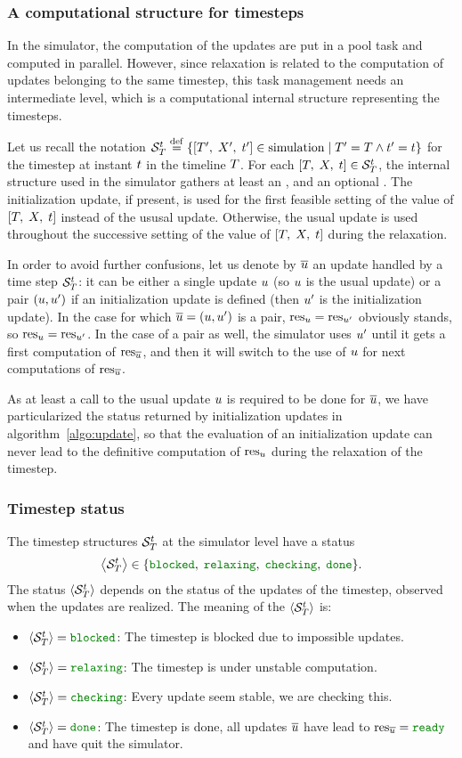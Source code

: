 \subsubsection{A computational structure for timesteps}

In the simulator, the computation of the updates are put in a pool task and computed in parallel. However, since relaxation is related to the computation of updates belonging to the same timestep, this task management needs an intermediate level, which is a computational internal structure representing the timesteps.

Let us recall the notation ${{{\cal S}}_{T}^{t}}\;{\stackrel{\mathrm{def}}{=}}\;{\left\{{\left[ T',\;X',\;t' \right]} \in {\mbox{simulation}}\; \middle| \; {{T'} = {T}} \wedge {{t'} = {t}}\right\}}$ for the timestep at instant $t$ in the timeline $T$. For each ${\left[ T,\;X,\;t \right]} \in {{{\cal S}}_{T}^{t}}$, the internal structure used in the simulator gathers at least an , and an optional . The initialization update, if present, is used for the first feasible setting of the value of $\left[ T,\;X,\;t \right]$ instead of the ususal update. Otherwise, the usual update is used throughout the successive setting of the value of $\left[ T,\;X,\;t \right]$ during the relaxation.


In order to avoid further confusions, let us denote by $\overline{u}$ an update handled by a time step ${{\cal S}}_{T}^{t}$: it can be either a single update $u$ (so $u$ is the usual update) or a pair $\left(u,u'\right)$ if an initialization update is defined (then $u'$ is the initialization update). In the case for which ${\overline{u}} = {\left(u,u'\right)}$ is a pair, ${{\mathrm{res}}_{u}} = {{\mathrm{res}}_{u'}}$ obviously stands, so ${{\mathrm{res}}_{u}} = {{\mathrm{res}}_{u'}}$. In the case of a pair as well, the simulator uses $u'$ until it gets a first computation of ${\mathrm{res}}_{\overline{u}}$, and then it will switch to the use of $u$ for next computations of ${\mathrm{res}}_{\overline{u}}$.

As at least a call to the usual update $u$ is required to be done for $\overline{u}$, we have particularized the status returned by initialization updates in algorithm~\ref{algo:update}, so that the evaluation of an initialization update can never lead to the definitive computation of ${\mathrm{res}}_{u}$ during the relaxation of the timestep.

\subsubsection{Timestep status}

The timestep structures ${{\cal S}}_{T}^{t}$ at the simulator level have a status $$\cxStatusSet.$$ The status $\left< {{\cal S}}_{T}^{t} \right>$ depends on the status of the updates of the timestep, observed when the updates are realized. The meaning of the $\left< {{\cal S}}_{T}^{t} \right>$ is:
\begin{itemize}
\item $\cxStatusTSBlocked$: The timestep is blocked due to impossible updates.
\item $\cxStatusTSRelaxing$: The timestep is under unstable computation.
\item $\cxStatusTSChecking$: Every update seem stable, we are checking this.
\item $\cxStatusTSDone$: The timestep is done, all updates $\overline{u}$ have lead to $\cxResUpdtReady$ and have quit the simulator.
\end{itemize}


